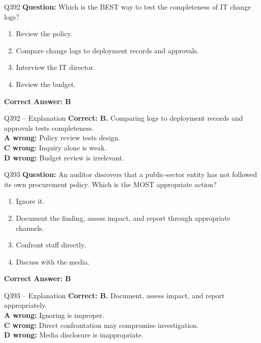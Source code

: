 \documentclass[aspectratio=169,10pt]{beamer}
\begin{document}
	\begin{frame}[t]{Q392}
		\small
		\textbf{Question:} Which is the BEST way to test the completeness of IT change logs?
		\begin{enumerate}[label=\Alph*.,itemsep=1pt,topsep=2pt]
			\item Review the policy.
			\item Compare change logs to deployment records and approvals.
			\item Interview the IT director.
			\item Review the budget.
		\end{enumerate}
		\vspace{4pt}
		\textbf{Correct Answer: B}
	\end{frame}
	
	\begin{frame}[t]{Q392 -- Explanation}
		\small
		\textbf{Correct: B.} Comparing logs to deployment records and approvals tests completeness. \\[4pt]
		\textbf{A wrong:} Policy review tests design. \\[2pt]
		\textbf{C wrong:} Inquiry alone is weak. \\[2pt]
		\textbf{D wrong:} Budget review is irrelevant.
	\end{frame}
	
	\begin{frame}[t]{Q393}
		\small
		\textbf{Question:} An auditor discovers that a public-sector entity has not followed its own procurement policy. Which is the MOST appropriate action?
		\begin{enumerate}[label=\Alph*.,itemsep=1pt,topsep=2pt]
			\item Ignore it.
			\item Document the finding, assess impact, and report through appropriate channels.
			\item Confront staff directly.
			\item Discuss with the media.
		\end{enumerate}
		\vspace{4pt}
		\textbf{Correct Answer: B}
	\end{frame}
	
	\begin{frame}[t]{Q393 -- Explanation}
		\small
		\textbf{Correct: B.} Document, assess impact, and report appropriately. \\[4pt]
		\textbf{A wrong:} Ignoring is improper. \\[2pt]
		\textbf{C wrong:} Direct confrontation may compromise investigation. \\[2pt]
		\textbf{D wrong:} Media disclosure is inappropriate.
	\end{frame}
	
\end{document}
